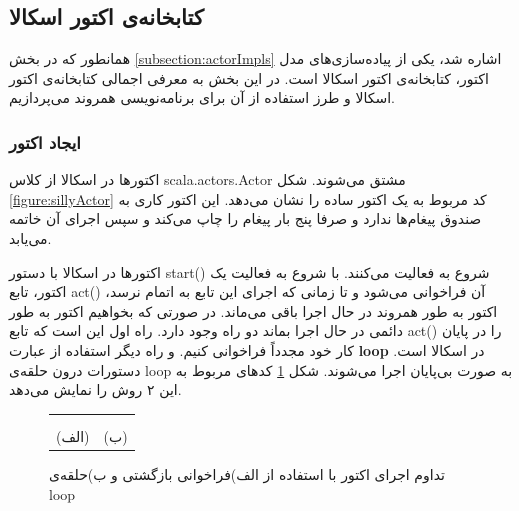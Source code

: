 \subsection{کتابخانه‌ی اکتور اسکالا}
\label{section:scalaActorLib}
همانطور که در بخش \ref{subsection:actorImpls} اشاره شد، یکی از پیاده‌سازی‌های مدل اکتور، کتابخانه‌ی اکتور اسکالا است. در این بخش به معرفی اجمالی کتابخانه‌ی اکتور اسکالا و طرز استفاده از آن برای برنامه‌نویسی همروند می‌پردازیم.
\subsubsection{ایجاد اکتور}
اکتور‌ها در اسکالا از کلاس scala.actors.Actor مشتق می‌شوند.  شکل \ref{figure:sillyActor} کد مربوط به  یک اکتور ساده را نشان می‌دهد. این اکتور کاری به صندوق پیغام‌ها ندارد و صرفا پنج بار پیغام  را چاپ می‌کند و سپس اجرای آن خاتمه می‌یابد.


  اکتور‌ها در اسکالا با دستور start() شروع به فعالیت می‌کنند. با شروع به فعالیت یک اکتور، تابع act() آن فراخوانی می‌شود و تا زمانی که اجرای این تابع به اتمام نرسد، اکتور به طور همروند در حال اجرا باقی می‌ماند. در صورتی که بخواهیم اکتور به طور دائمی در حال اجرا بماند دو راه وجود دارد. راه اول این است که تابع act() را در پایان کار  خود مجدداً فراخوانی کنیم. و راه دیگر استفاده از عبارت \textbf{loop} در اسکالا است. دستورات درون حلقه‌ی loop به صورت بی‌پایان اجرا می‌شوند. شکل \ref{fig:endlessActor} کدهای مربوط به این ۲ روش را نمایش می‌دهد.

\begin{figure}
    \begin{center}
    \begin{tabular}{ c  c }
	 & \\

	\begin{latin}
\linespread{1.1}

\end{latin} & 
 \begin{latin}
	\linespread{1.1}
	
\end{latin}
 	\\
         (الف) & (ب) \\
    \end{tabular}
    \end{center}
    \caption{\label{fig:endlessActor} تداوم اجرای اکتور با استفاده از الف)فراخوانی بازگشتی و ب)حلقه‌ی loop}
\end{figure}


